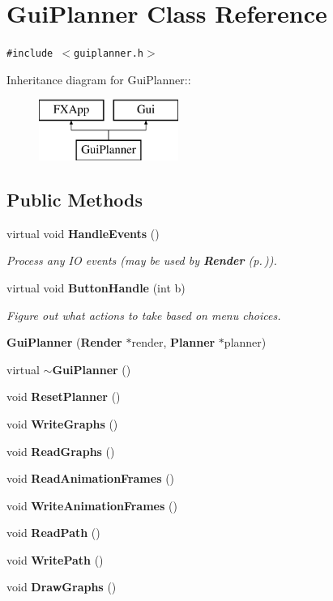 \section{Gui\-Planner  Class Reference}
\label{classGuiPlanner}
{\tt \#include $<$guiplanner.h$>$}

Inheritance diagram for Gui\-Planner::\begin{figure}[H]
\begin{center}
\leavevmode
\includegraphics[height=2cm]{classGuiPlanner}
\end{center}
\end{figure}
\subsection*{Public Methods}
\begin{CompactItemize}
\item 
virtual void {\bf Handle\-Events} ()
\begin{CompactList}\small\item\em Process any IO events (may be used by {\bf Render} {\rm (p.\,\pageref{classRender})}).\item\end{CompactList}\item 
virtual void {\bf Button\-Handle} (int b)
\begin{CompactList}\small\item\em Figure out what actions to take based on menu choices.\item\end{CompactList}\item 
{\bf Gui\-Planner} ({\bf Render} $\ast$render, {\bf Planner} $\ast$planner)
\item 
virtual {\bf $\sim$Gui\-Planner} ()
\item 
void {\bf Reset\-Planner} ()
\item 
void {\bf Write\-Graphs} ()
\item 
void {\bf Read\-Graphs} ()
\item 
void {\bf Read\-Animation\-Frames} ()
\item 
void {\bf Write\-Animation\-Frames} ()
\item 
void {\bf Read\-Path} ()
\item 
void {\bf Write\-Path} ()
\item 
void {\bf Draw\-Graphs} ()
\end{CompactItemize}
